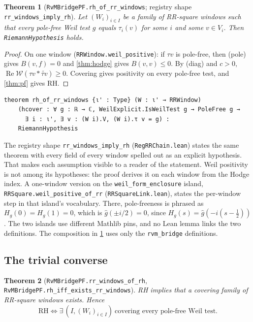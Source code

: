 \documentclass[11pt]{article}
\newtheorem{theorem}{Theorem}
\theoremstyle{definition}
\newcommand{\lean}[1]{\texttt{#1}}
\newcommand{\re}{\operatorname{Re}}
\newcommand{\Weil}{\mathcal{W}}
\begin{document}
\begin{theorem}[\lean{RvMBridgePF.rh\_of\_rr\_windows}; registry shape \lean{rr\_windows\_imply\_rh}]\label{thm:windows}
Let $(W_i)_{i\in I}$ be a family of RR-square windows such that every pole-free Weil test $g$ equals $\tau_i(v)$ for some $i$ and some $v \in V_i$. Then \lean{RiemannHypothesis} holds.
\end{theorem}

\begin{proof}
On one window (\lean{RRWindow.weil\_positive}): if $\tau v$ is pole-free, then (pole) gives $B(v,f) = 0$ and \cref{thm:hodge} gives $B(v,v)\le 0$. By (diag) and $c > 0$, $\re\Weil(\tau v * \widetilde{\tau v}) \ge 0$. Covering gives positivity on every pole-free test, and \cref{thm:pf} gives RH.
\end{proof}

\begin{lstlisting}
theorem rh_of_rr_windows {ι' : Type} (W : ι' → RRWindow)
    (hcover : ∀ g : ℝ → ℂ, WeilExplicit.IsWeilTest g → PoleFree g →
      ∃ i : ι', ∃ v : (W i).V, (W i).τ v = g) :
    RiemannHypothesis
\end{lstlisting}

The registry shape \lean{rr\_windows\_imply\_rh} (\lean{RegRRChain.lean}) states the same theorem with every field of every window spelled out as an explicit hypothesis. That makes each assumption visible to a reader of the statement. Weil positivity is not among its hypotheses: the proof derives it on each window from the Hodge index. A one-window version on the \lean{weil\_form\_enclosure} island, \lean{RRSquare.weil\_positive\_of\_rr} (\lean{RRSquareLink.lean}), states the per-window step in that island's vocabulary. There, pole-freeness is phrased as $H_g(0) = H_g(1) = 0$, which is $\hat g(\pm i/2) = 0$, since $H_g(s) = \hat g(-i(s-\tfrac12))$. The two islands use different Mathlib pins, and no Lean lemma links the two definitions. The composition in \cref{thm:windows} uses only the \lean{rvm\_bridge} definitions.

\subsection{The trivial converse}

\begin{theorem}[\lean{RvMBridgePF.rr\_windows\_of\_rh}, \lean{RvMBridgePF.rh\_iff\_exists\_rr\_windows}]\label{thm:iff}
RH implies that a covering family of RR-square windows exists. Hence
\[
\mathrm{RH} \iff \exists\,(I, (W_i)_{i\in I})\ \text{covering every pole-free Weil test}.
\]
\end{theorem}
\end{document}
